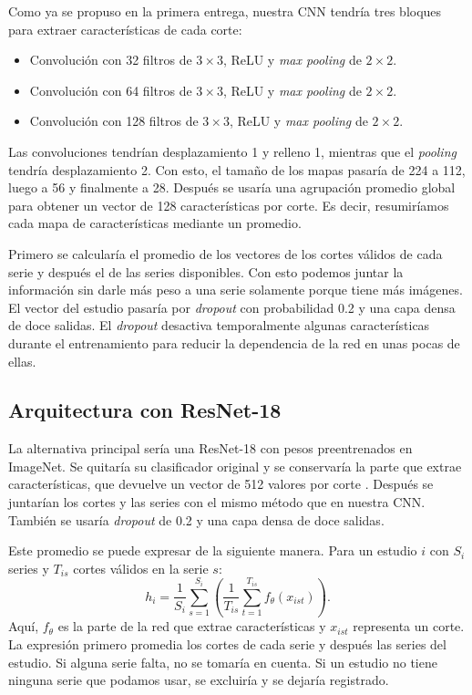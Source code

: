 \documentclass[eng]{ajceam-class}
\begin{document}
Como ya se propuso en la primera entrega, nuestra CNN tendría tres bloques para extraer características de cada corte:
\begin{itemize}
    \item Convolución con 32 filtros de $3\times3$, ReLU y \textit{max pooling} de $2\times2$.
    \item Convolución con 64 filtros de $3\times3$, ReLU y \textit{max pooling} de $2\times2$.
    \item Convolución con 128 filtros de $3\times3$, ReLU y \textit{max pooling} de $2\times2$.
\end{itemize}

Las convoluciones tendrían desplazamiento 1 y relleno 1, mientras que el \textit{pooling} tendría desplazamiento 2. Con esto, el tamaño de los mapas pasaría de 224 a 112, luego a 56 y finalmente a 28. Después se usaría una agrupación promedio global para obtener un vector de 128 características por corte. Es decir, resumiríamos cada mapa de características mediante un promedio.

Primero se calcularía el promedio de los vectores de los cortes válidos de cada serie y después el de las series disponibles. Con esto podemos juntar la información sin darle más peso a una serie solamente porque tiene más imágenes. El vector del estudio pasaría por \textit{dropout} con probabilidad 0.2 y una capa densa de doce salidas. El \textit{dropout} desactiva temporalmente algunas características durante el entrenamiento para reducir la dependencia de la red en unas pocas de ellas.

\subsection{Arquitectura con ResNet-18}

La alternativa principal sería una ResNet-18 con pesos preentrenados en ImageNet. Se quitaría su clasificador original y se conservaría la parte que extrae características, que devuelve un vector de 512 valores por corte \cite{he2016,torchresnet}. Después se juntarían los cortes y las series con el mismo método que en nuestra CNN. También se usaría \textit{dropout} de 0.2 y una capa densa de doce salidas.

Este promedio se puede expresar de la siguiente manera. Para un estudio $i$ con $S_i$ series y $T_{is}$ cortes válidos en la serie $s$:
\begin{equation}
h_i=\frac{1}{S_i}\sum_{s=1}^{S_i}
\left(\frac{1}{T_{is}}\sum_{t=1}^{T_{is}}f_\theta(x_{ist})\right).
\end{equation}
Aquí, $f_\theta$ es la parte de la red que extrae características y $x_{ist}$ representa un corte. La expresión primero promedia los cortes de cada serie y después las series del estudio. Si alguna serie falta, no se tomaría en cuenta. Si un estudio no tiene ninguna serie que podamos usar, se excluiría y se dejaría registrado.
\end{document}
